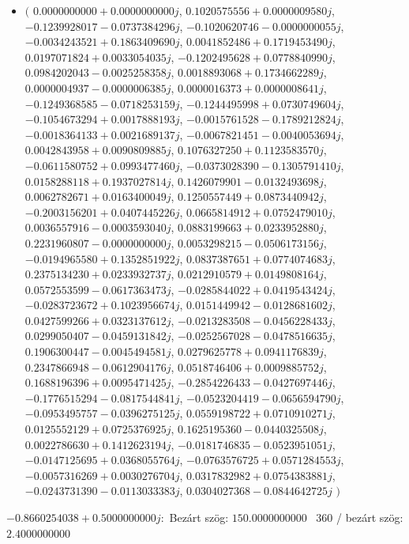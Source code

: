 \documentclass[14pt,a4paper]{article}
\begin{document}
\begin{itemize}
\item
$\big($
$0.0000000000+0.0000000000j$, $0.1020575556+0.0000009580j$, $-0.1239928017-0.0737384296j$, $-0.1020620746-0.0000000055j$, $-0.0034243521+0.1863409690j$, $0.0041852486+0.1719453490j$, $0.0197071824+0.0033054035j$, $-0.1202495628+0.0778840990j$, $0.0984202043-0.0025258358j$, $0.0018893068+0.1734662289j$, $0.0000004937-0.0000006385j$, $0.0000016373+0.0000008641j$, $-0.1249368585-0.0718253159j$, $-0.1244495998+0.0730749604j$, $-0.1054673294+0.0017888193j$, $-0.0015761528-0.1789212824j$, $-0.0018364133+0.0021689137j$, $-0.0067821451-0.0040053694j$, $0.0042843958+0.0090809885j$, $0.1076327250+0.1123583570j$, $-0.0611580752+0.0993477460j$, $-0.0373028390-0.1305791410j$, $0.0158288118+0.1937027814j$, $0.1426079901-0.0132493698j$, $0.0062782671+0.0163400049j$, $0.1250557449+0.0873440942j$, $-0.2003156201+0.0407445226j$, $0.0665814912+0.0752479010j$, $0.0036557916-0.0003593040j$, $0.0883199663+0.0233952880j$, $0.2231960807-0.0000000000j$, $0.0053298215-0.0506173156j$, $-0.0194965580+0.1352851922j$, $0.0837387651+0.0774074683j$, $0.2375134230+0.0233932737j$, $0.0212910579+0.0149808164j$, $0.0572553599-0.0617363473j$, $-0.0285844022+0.0419543424j$, $-0.0283723672+0.1023956674j$, $0.0151449942-0.0128681602j$, $0.0427599266+0.0323137612j$, $-0.0213283508-0.0456228433j$, $0.0299050407-0.0459131842j$, $-0.0252567028-0.0478516635j$, $0.1906300447-0.0045494581j$, $0.0279625778+0.0941176839j$, $0.2347866948-0.0612904176j$, $0.0518746406+0.0009885752j$, $0.1688196396+0.0095471425j$, $-0.2854226433-0.0427697446j$, $-0.1776515294-0.0817544841j$, $-0.0523204419-0.0656594790j$, $-0.0953495757-0.0396275125j$, $0.0559198722+0.0710910271j$, $0.0125552129+0.0725376925j$, $0.1625195360-0.0440325508j$, $0.0022786630+0.1412623194j$, $-0.0181746835-0.0523951051j$, $-0.0147125695+0.0368055764j$, $-0.0763576725+0.0571284553j$, $-0.0057316269+0.0030276704j$, $0.0317832982+0.0754383881j$, $-0.0243731390-0.0113033383j$, $0.0304027368-0.0844642725j$
$\big)$
\end{itemize}
$-0.8660254038+0.5000000000j$:\
Bezárt szög: $150.0000000000$ \
360 / bezárt szög: $2.4000000000$\
\end{document}
